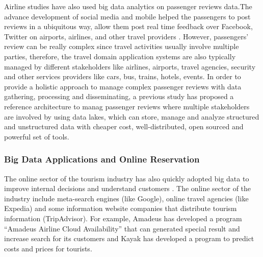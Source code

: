 Airline studies have also used big data analytics on passenger reviews data.The advance development of social media and mobile helped the passengers to post reviews in a ubiquitous way, allow them post real time feedback over Facebook, Twitter on airports, airlines, and other travel providers \cite{CHEN2016285}. However, passengers' review can be really complex since travel activities usually involve multiple parties, therefore, the travel domain application systems are also typically managed by different stakeholders like airlines, airports, travel agencies, security and other services providers like cars, bus, trains, hotels, events. In order to provide a holistic approach to manage complex passenger reviews with data gathering, processing and disseminating, a previous study has proposed a reference architecture to manag passenger reviews where multiple stakeholders are involved by using data lakes, which can store, manage and analyze structured and unstructured data with cheaper cost, well-distributed, open sourced and powerful set of tools.

\subsubsection{Big Data Applications and Online Reservation}
The online sector of the tourism industry has also
quickly adopted big data to improve internal decisions and understand customers 
\cite{akerkar2012}. The online sector of the industry include  meta-search engines (like 
Google), online travel agencies (like Expedia) and some information website companies that
distribute tourism information (TripAdvisor)\cite{MIAH2017}. For example, Amadeus has 
developed a program ``Amadeus Airline Cloud Availability'' that can generated special 
result and increase search for its customers and Kayak has developed a program to predict 
costs and prices for tourists\cite{Shafiee16}.


